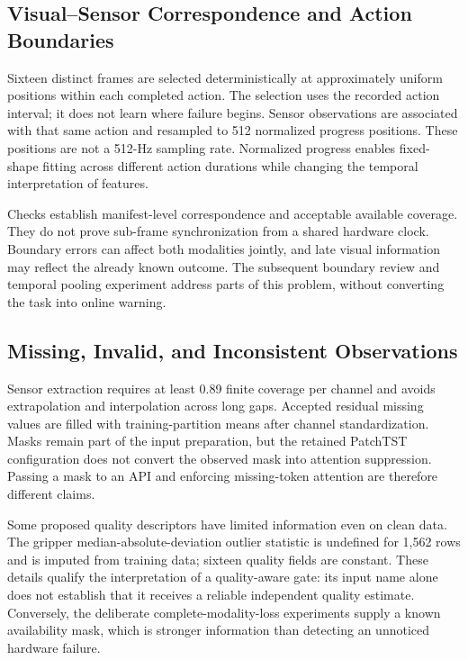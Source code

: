 \subsection{Visual--Sensor Correspondence and Action Boundaries}
Sixteen distinct frames are selected deterministically at approximately uniform positions within each completed action. The selection uses the recorded action interval; it does not learn where failure begins. Sensor observations are associated with that same action and resampled to 512 normalized progress positions. These positions are not a 512-Hz sampling rate. Normalized progress enables fixed-shape fitting across different action durations while changing the temporal interpretation of features.

Checks establish manifest-level correspondence and acceptable available coverage. They do not prove sub-frame synchronization from a shared hardware clock. Boundary errors can affect both modalities jointly, and late visual information may reflect the already known outcome. The subsequent boundary review and temporal pooling experiment address parts of this problem, without converting the task into online warning.

\subsection{Missing, Invalid, and Inconsistent Observations}
Sensor extraction requires at least 0.89 finite coverage per channel and avoids extrapolation and interpolation across long gaps. Accepted residual missing values are filled with training-partition means after channel standardization. Masks remain part of the input preparation, but the retained PatchTST configuration does not convert the observed mask into attention suppression. Passing a mask to an API and enforcing missing-token attention are therefore different claims.

Some proposed quality descriptors have limited information even on clean data. The gripper median-absolute-deviation outlier statistic is undefined for 1,562 rows and is imputed from training data; sixteen quality fields are constant. These details qualify the interpretation of a quality-aware gate: its input name alone does not establish that it receives a reliable independent quality estimate. Conversely, the deliberate complete-modality-loss experiments supply a known availability mask, which is stronger information than detecting an unnoticed hardware failure.

